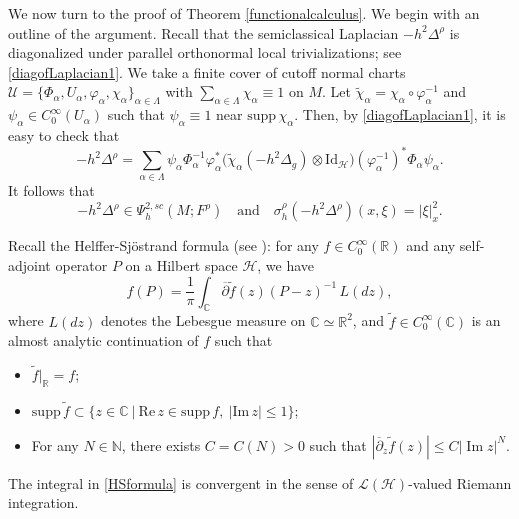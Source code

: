 \documentclass[11pt,oneside,reqno]{amsart}
\newcommand\N{\ensuremath{\mathbb{N}}}
\newcommand\R{\ensuremath{\mathbb{R}}}
\newcommand\C{\ensuremath{\mathbb{C}}}
\theoremstyle{definition}
\numberwithin{equation}{section}
\theoremstyle{plain}
\begin{document}
We now turn to the proof of Theorem \ref{functionalcalculus}. We begin with an outline of the argument. Recall that the semiclassical Laplacian $-h^2\Delta^{\rho}$ is diagonalized under parallel orthonormal local trivializations; see \eqref{diagofLaplacian1}. We take a finite cover of cutoff normal charts $\mathcal{U}=\{\Phi_{\alpha},U_{\alpha},\varphi_{\alpha},\chi_{\alpha}\}_{\alpha \in \Lambda}$ with $\sum_{\alpha\in\Lambda} \chi_\alpha\equiv 1$ on $M$. Let $\widetilde{\chi}_\alpha =\chi_{\alpha} \circ \varphi_\alpha^{-1}$ and $\psi_{\alpha}\in C_{0}^{\infty}(U_\alpha)$ such that $\psi_{\alpha}\equiv 1$ near $\mathrm{supp}\,\chi_\alpha$. Then, by \eqref{diagofLaplacian1}, it is easy to check that
\begin{equation*}
    -h^2\Delta^{\rho}=\sum_{\alpha\in \Lambda}\psi_{\alpha}\Phi_{\alpha}^{-1}\varphi_{\alpha}^* \big(\widetilde{\chi}_{\alpha}(-h^2\Delta_{g})\otimes \mathrm{Id}_{\mathcal{H}} \big)(\varphi_{\alpha}^{-1})^*\Phi_{\alpha}\psi_{\alpha}.
\end{equation*}
It follows that
\begin{equation}
-h^2\Delta^{\rho}\in \Psi^{2,sc}_h(M;F^\rho) \quad \text{and} \quad \sigma_{h}^{\rho}(-h^2\Delta^{\rho}) (x,\xi)=|\xi|^2_x.
\end{equation}

Recall the Helffer-Sjöstrand formula (see \cite[Theorem 8.1]{DimassiSjostrand99}): for any $f \in C_{0}^{\infty}(\mathbb{R})$ and any self-adjoint operator $P$ on a Hilbert space $\mathcal{H}$, we have
\begin{equation}\label{HSformula}
f(P)= \frac{1}{\pi } \int_{\mathbb{C}} \overline{\partial} \widetilde{f}(z)(P-z)^{-1} \,L(d z),
\end{equation}
where $L(d z)$ denotes the Lebesgue measure on $\mathbb{C}\simeq \R^2$, and $\widetilde{f} \in C_{0}^{\infty}(\mathbb{C})$ is an almost analytic continuation of $f$ such that 
\begin{itemize}
    \item $\widetilde{f} \big|_{\R}=f$;
    \item $\mathrm{supp}\,\widetilde{f}\subset \{z\in \C \ | \ \mathrm{Re} \, z \in \mathrm{supp}\,f, \ |\mathrm{Im} \, z|\leq 1 \} $;
    \item For any $N\in \N$, there exists $C=C(N)>0$ such that $|\overline{\partial}_z \widetilde{f}(z)| \leq C|\operatorname{Im}z|^N$.
\end{itemize}
The integral in \eqref{HSformula} is convergent in the sense of $\mathcal{L}(\mathcal{H})$-valued Riemann integration. 
\end{document}
